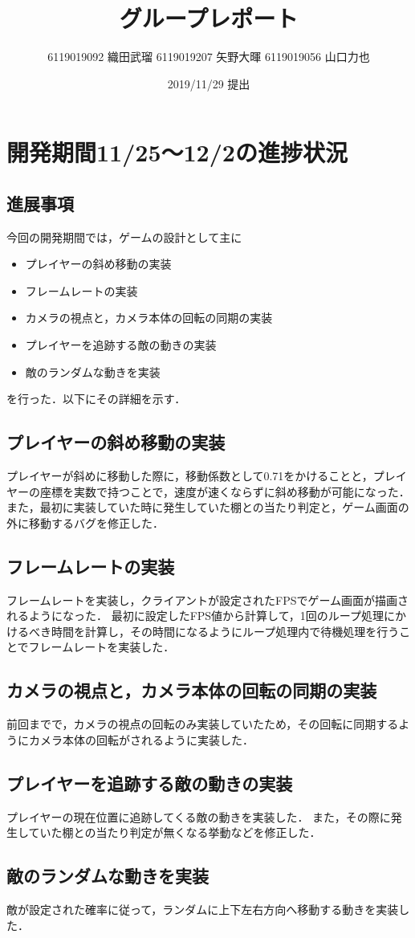 \documentclass{jarticle}
\title{グループレポート}
\author{6119019092 織田武瑠 6119019207 矢野大暉 6119019056 山口力也}
\date{2019/11/29 提出}
\newcommand{\xa}{プレイヤーの斜め移動の実装}
\newcommand{\xb}{フレームレートの実装}
\newcommand{\xc}{カメラの視点と，カメラ本体の回転の同期の実装}
\newcommand{\xd}{プレイヤーを追跡する敵の動きの実装}
\newcommand{\xe}{敵のランダムな動きを実装}
\newcommand{\pitem}[5]{
\item #1
\item #2
\item #3
\item #4
\item #5
}
\begin{document}
\maketitle

\section{開発期間11/25～12/2の進捗状況} 

\subsection{進展事項}
今回の開発期間では，ゲームの設計として主に
\begin{itemize}
\pitem{\xa}{\xb}{\xc}{\xd}{\xe}
\end{itemize}
を行った．以下にその詳細を示す．

\subsection{\xa}
プレイヤーが斜めに移動した際に，移動係数として0.71をかけることと，プレイヤーの座標を実数で持つことで，速度が速くならずに斜め移動が可能になった．また，最初に実装していた時に発生していた棚との当たり判定と，ゲーム画面の外に移動するバグを修正した．

\subsection{\xb}
フレームレートを実装し，クライアントが設定されたFPSでゲーム画面が描画されるようになった．
最初に設定したFPS値から計算して，1回のループ処理にかけるべき時間を計算し，その時間になるようにループ処理内で待機処理を行うことでフレームレートを実装した．

\subsection{\xc}
前回までで，カメラの視点の回転のみ実装していたため，その回転に同期するようにカメラ本体の回転がされるように実装した．

\subsection{\xd}
プレイヤーの現在位置に追跡してくる敵の動きを実装した．
また，その際に発生していた棚との当たり判定が無くなる挙動などを修正した．

\subsection{\xe}
敵が設定された確率に従って，ランダムに上下左右方向へ移動する動きを実装した．
\end{document}
